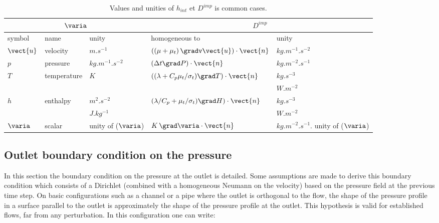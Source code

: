 \begin{table}
\begin{center}
\begin{tabular}{||l|l|l||l|l||}
\hline
\multicolumn{3}{||c||}{$\varia$} & \multicolumn{2}{c||}{$D^{imp}$} \\
\hline
symbol     & name                & unity         & homogeneous to             & unity                                     \\
\hline
$\vect{u}$ & velocity            & $m.s^{-1}$         &$\left( (\mu+\mu_t)\,\gradv \vect{u} \right)\cdot \vect{n}$  & $kg.m^{-1}.s^{-2} $       \\
$p$        & pressure            & $kg.m^{-1}.s^{-2}$ &$\left( \Delta t \grad P \right) \cdot \vect{n}$             & $kg.m^{-2}.s^{-1}$                        \\
$T$        & temperature         & $K$                &$\left( (\lambda+C_p\mu_t/\sigma_t)\grad T\right) \cdot \vect{n} $ &$kg.s^{-3}$ \\
                 &                         &                                     &                                  &$W.m^{-2}$ \\       
$h$          & enthalpy           & $m^{2}.s^{-2}$          &$\left( \lambda/C_p+\mu_t/\sigma_t) \grad H \right) \cdot \vect{n}$&$kg.s^{-3}$ \\
                 &                        & $J.kg^{-1}$               &                                                                                                               & $W.m^{-2}$  \\
$\varia$   & scalar               & unity of ($\varia$)       &$K \,\grad \varia \cdot \vect{n}$              & $kg.m^{-2}.s^{-1}.$ unity of ($\varia$)       \\
\hline
\end{tabular}
\end{center}
\caption{Values and unities of $h_{int}$ et $D^{imp}$  is common cases.}\label{tab:bndcnd:hint_phi_condli}
\end{table}

\subsection{Outlet boundary condition on the pressure}\label{Base_Condli_Sortie_Pression}

In this section the boundary condition on the pressure at the outlet is detailed. Some
assumptions are made to derive this boundary condition which consists of a Dirichlet
(combined with a homogeneous Neumann on the velocity) based on the pressure field
at the previous time step.
On basic configurations such as a channel or a pipe where the outlet is orthogonal 
to the flow, the shape of the pressure profile in a surface parallel to the outlet is
approximately the shape of the pressure profile at the outlet. This hypothesis 
is valid for established flows, far from any perturbation. In this configuration
one can write:

